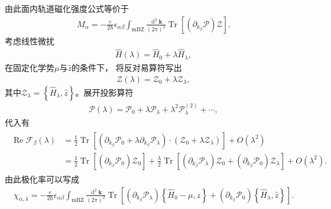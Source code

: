 \documentclass[10pt, oneside]{article}
\begin{document}
由此面内轨道磁化强度公式等价于
\begin{align}
	\boxed{
		M_{\alpha} = - \frac{e }{2\hbar} \epsilon_{\alpha \beta} \int_{\mathrm{mBZ}}  \frac{\operatorname{d}^{2} \bm{k}}{\left(2 \pi\right)^{2}} \operatorname{Tr} \left[\left(\partial_{k_{\beta}} \mathcal{P}\right) \mathcal{Z} \right].
	}
\end{align}
考虑线性微扰
\begin{align}
	\hat{H} \left(\lambda\right) = \hat{H}_0 + \lambda \hat{H}_{\lambda},
\end{align}
在固定化学势\(\mu\)与\(\hat{z}\)的条件下， 将反对易算符写出
\begin{align}
	\mathcal{Z}\left(\lambda\right) = \mathcal{Z}_{0} + \lambda \mathcal{Z}_{\lambda},	
\end{align}
其中\(\mathcal{Z}_{\lambda} = \left\{\hat{H}_{\lambda} , \hat{z}\right\}\)。展开投影算符
\begin{align}
	\mathcal{P} \left(\lambda\right) = \mathcal{P}_{0} + \lambda \mathcal{P}_{\lambda} + \lambda^{2} \mathcal{P}^{\left(2\right)}_{\lambda} + \cdots,
\end{align}
代入有
\begin{align}
	\begin{split}
		\operatorname{Re} \mathcal{F}_{\beta} \left(\lambda\right) &= \frac{1}{2} \operatorname{Tr} \left[\left(\partial_{k_{\beta}} \mathcal{P}_{0} + \lambda \partial_{k_{\beta}} \mathcal{P}_{\lambda}\right) \cdot \left(\mathcal{Z}_{0} + \lambda \mathcal{Z}_{\lambda}\right)\right] + O \left(\lambda^{2}\right) \\
		&= \frac{1}{2} \operatorname{Tr} \left[\left(\partial_{k_{\beta}} \mathcal{P}_{0}\right) \mathcal{Z}_{0} \right] + \frac{\lambda}{2} \operatorname{Tr} \left[\left(\partial_{k_{\beta}} \mathcal{P}_{\lambda} \right) \mathcal{Z}_{0} + \left(\partial_{k_{\beta}} \mathcal{P}_{0}\right) \mathcal{Z}_{\lambda} \right] + O \left(\lambda^{2}\right).
	\end{split}
\end{align}
由此极化率可以写成
\begin{align}
	\boxed{
		\chi_{\alpha, \lambda} = - \frac{e }{2 \hbar} \epsilon_{\alpha \beta} \int_{\mathrm{mBZ}} \frac{\operatorname{d}^{2} \bm{k}}{\left(2 \pi\right)^{2}} \operatorname{Tr}\left[\left(\partial_{k_{\beta}} \mathcal{P}_{\lambda}\right) \left\{\hat{H}_{0} - \mu , \hat{z}\right\} + \left(\partial_{k_{\beta}} \mathcal{P}_{0}\right) \left\{\hat{H}_{\lambda}, \hat{z}\right\} \right].
	}
\end{align}
\end{document}
